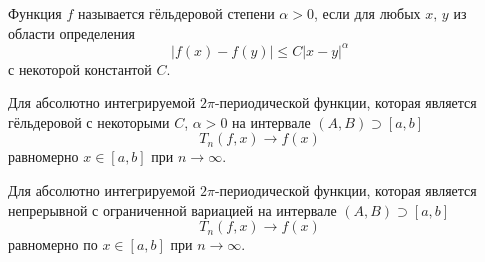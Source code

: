 \begin{to_def}
    Функция $f$ называется гёльдеровой степени $\alpha > 0$, если для любых $x, \, y$ из области определения
    \begin{equation*}
        |f(x) -f(y)| \leq C |x-y|^{\alpha}
    \end{equation*}
    с некоторой константой $C$.
\end{to_def}


\begin{to_thr}
    Для абсолютно интегрируемой $2\pi$-периодической функции, которая является гёльдеровой с некоторыми $C$, $\alpha > 0$ на интервале $(A, B) \supset [a, b]$
    \begin{equation*}
        T_n (f, x) \to f(x)
    \end{equation*}
    равномерно $x \in [a, b]$ при $n \to \infty$.
\end{to_thr}

\begin{to_thr}
    Для абсолютно интегрируемой $2\pi$-периодической функции, которая является непрерывной с ограниченной вариацией на интервале $(A, B) \supset [a, b]$
    \begin{equation*}
        T_n (f, x) \to f(x)
    \end{equation*}
    равномерно по $x \in [a, b]$ при $n \to \infty$.
\end{to_thr}


